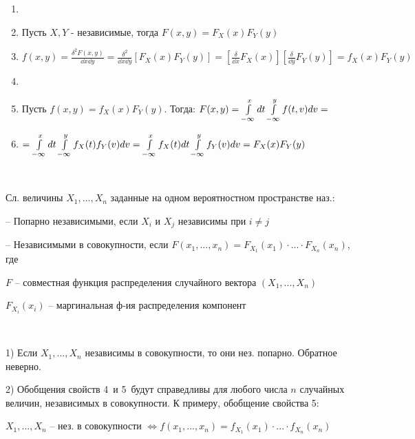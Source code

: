 \begin{enumerate}[topsep=0pt, leftmargin=20pt, noitemsep, label=\arabic*\degree]
	\item \NEOB
	\item [] Пусть $X,Y$ - независимые, тогда $F(x,y)=F_X(x)F_Y(y)$
	\item [] $f(x,y)=\tfrac{\delta^2 F(x,y)}{\dd{x}\dd{y}}=\tfrac{\delta^2}{\dd{x}\dd{y}}[F_X(x)F_Y(y)]=[\tfrac{\delta}{\dd{x}}F_X(x)][\tfrac{\delta}{\dd{y}}F_Y(y)]=f_X(x)F_Y(y)$
	\item [] \DOST
	\item [] Пусть $f(x,y)=f_X(x)F_Y(y)$. Тогда: $F(x,y)=\int\limits_{-\infty}^{x}dt\int\limits_{-\infty}^{y}f(t,v)dv=$
	\item [] $=\int\limits_{-\infty}^{x}dt\int\limits_{-\infty}^{y}f_X(t)f_Y(v)dv=\int\limits_{-\infty}^{x}f_X(t)dt\int\limits_{-\infty}^{y}f_Y(v)dv=F_X(x)F_Y(y)$
\end{enumerate}

~

\OPR Сл. величины $X_1,...,X_n$ заданные на одном вероятностном пространстве наз.:

-- Попарно независимыми, если
$X_i$ и $X_j$ независимы при $i\neq j$

-- Независимыми в совокупности, если
$F(x_1,...,x_n)=F_{X_1}(x_1)\cdot...\cdot F_{X_n}(x_n)$, где

$F$ -- совместная функция распределения случайного вектора
$(X_1,...,X_n)$

$F_{X_i}(x_i)$ -- маргинальная ф-ия распределения компонент

~

\ZAM 

1) Если $X_1,...,X_n$ независимы в совокупности, то они нез. попарно. Обратное неверно.

2) Обобщения свойств 4\degree ~и 5\degree ~будут справедливы для любого числа
$n$
случайных величин, независимых в совокупности. К примеру, обобщение свойства 5\degree:

$X_1,...,X_n$ -- нез. в совокупности $\Leftrightarrow f(x_1,...,x_n)=f_{X_1}(x_1)\cdot...\cdot f_{X_n}(x_n)$

\clearpage
